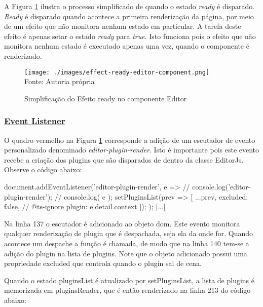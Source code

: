 A
Figura \ref{fig:effect-ready-editor-component}
ilustra o processo simplificado de quando o estado \textit{ready} é disparado.
\textit{Ready} é disparado quando acontece a primeira renderização da página, por meio
de um efeito que não monitora nenhum estado em particular. A tarefa deste efeito
é apenas setar o estado \textit{ready} para \textit{true}. Isto funciona pois o efeito que
não monitora nenhum estado é executado apenas uma vez, quando o componente é
renderizado.

\begin{figure}[H]
    \centering
    \caption{Simplificação do Efeito ready no componente Editor}
    \texttt{[image: ./images/effect-ready-editor-component.png]}
    \label{fig:effect-ready-editor-component} \\
    \textnormal{\fontsize{10pt}{12pt}Fonte: Autoria própria}
\end{figure}

\subsubsection{\underline{Event Listener}}

O quadro vermelho na
Figura \ref{fig:effect-ready-editor-component}
corresponde a adição de um escutador de
evento personalizado denominado \textit{editor-plugin-render}.
Isto é importante pois este evento recebe a criação dos plugins que
são disparados de dentro da classe EditorJs. Observe o código abaixo:

\begin{Codef03ecdca98c14c2bbeed23cbf3e99556}
[...]
document.addEventListener('editor-plugin-render', e => {
    // console.log('editor-plugin-render');
    // console.log({ e });
    setPluginsList(prev => [
        ...prev,
        {
            excluded: false,
            // @ts-ignore
            plugin: e.detail.context
        }
    ]);
});
[...]
\end{Codef03ecdca98c14c2bbeed23cbf3e99556}

Na linha 137 o escutador é adicionado ao objeto
\acrshort{dom}. Este evento monitora
qualquer renderização de plugin que é despachada, seja ela da onde
for. Quando acontece um despache a função é chamada, de modo que na linha
140 tem-se a adição do plugin na lista de plugins.
Note que o objeto adicionado possui uma propriedade excluded
que controla quando o plugin sai de cena.

Quando o estado
pluginsList
é atualizado por setPluginsList, a lista de plugins
é memorizada em pluginsRender, que é então
renderizado na linha 213 do código abaixo:

